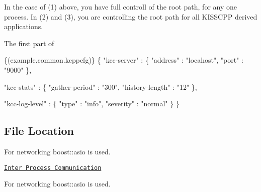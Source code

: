 In the case of (1) above, you have full controll of the root path, for any one process. In (2) and (3), you are controlling the root path for all K\-I\-S\-S\-C\-P\-P derived applications.


\begin{DoxyEnumerate}
\item The first part of
\end{DoxyEnumerate}


\begin{DoxyCode}
\{(example.common.kcppcfg)\}
\{
  \textcolor{stringliteral}{"kcc-server"}    : \{
    \textcolor{stringliteral}{"address"}        : \textcolor{stringliteral}{"locahost"},
    \textcolor{stringliteral}{"port"}           : \textcolor{stringliteral}{"9000"}
  \},

  \textcolor{stringliteral}{"kcc-stats"}     : \{
    \textcolor{stringliteral}{"gather-period"}  : \textcolor{stringliteral}{"300"},
    \textcolor{stringliteral}{"history-length"} : \textcolor{stringliteral}{"12"}
  \},

  \textcolor{stringliteral}{"kcc-log-level"} : \{
    \textcolor{stringliteral}{"type"}           : \textcolor{stringliteral}{"info"},
    \textcolor{stringliteral}{"severity"}       : \textcolor{stringliteral}{"normal"}
  \}
\}
\end{DoxyCode}


\subsection*{File Location}


\begin{DoxyEnumerate}
\item For networking boost\-::asio is used.

\href{md_inter_process_communication.html}{\tt Inter Process Communication}
\item For networking boost\-::asio is used. 
\end{DoxyEnumerate}